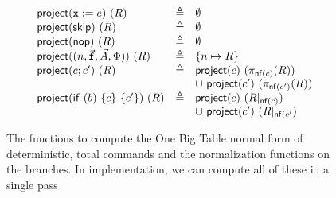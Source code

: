 \begin{figure}[tp]
\[\begin{array}{lcl}
      \mathsf{project}(\texttt{x} := e)~(R)
      &\triangleq
      & \emptyset \\
      \mathsf{project}(\mathsf{skip})~(R)
      &\triangleq
      & \emptyset \\
      \mathsf{project}(\mathsf{nop})~(R)
      & \triangleq
      & \emptyset \\
      \mathsf{project}((n,\vec{\texttt{f}}, \vec A, \Phi))~(R)
      &\triangleq
      & \{n \mapsto R\}\\
      \mathsf{project}(c;c')~(R)
      &\triangleq
      & \mathsf{project}(c)~(\pi_{\mathsf{nf}(c)}(R)) \\
      && \cup~\mathsf{project}(c')~(\pi_{\mathsf{nf}(c')}(R))\\
      \mathsf{project}(\mathsf{if}~(b)~\{c\}~\{c'\})~(R)
      &\triangleq 
      & \mathsf{project}(c)~(R|_{\mathsf{nf}(c)}) \\
      && \cup~\mathsf{project}(c')~(R|_{\mathsf{nf}(c'})
    \end{array}
  \]
  \caption{The functions to compute the One Big Table normal form of
    deterministic, total commands and the normalization functions on
    the branches. In implementation, we can compute all of these in
    a single pass}
  \label{fig:normal-form}
\end{figure}


